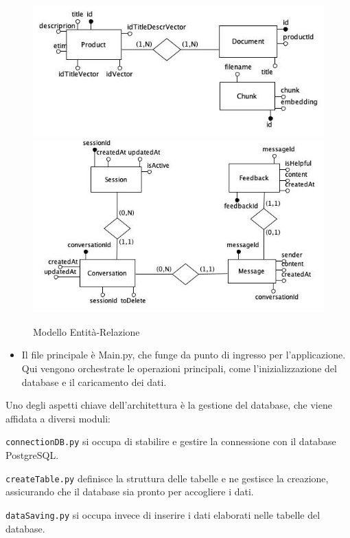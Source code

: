 \begin{figure}[H]
    \centering
    \includegraphics[width=\textwidth]{images/productER.er.jpg}
    \includegraphics[width=\textwidth]{images/MessagesER.er.jpg}
    \caption{Modello Entit\`a-Relazione}
    \label{fig:Diagramma ER}
\end{figure}

\begin{itemize}
\item Il file principale è \texttt{}{Main.py}, che funge da punto di ingresso per l'applicazione. Qui vengono orchestrate le operazioni principali, come l'inizializzazione del database e il caricamento dei dati.
\end{itemize}
Uno degli aspetti chiave dell'architettura è la gestione del database, che viene affidata a diversi moduli:

\texttt{connectionDB.py} si occupa di stabilire e gestire la connessione con il database PostgreSQL.

\texttt{createTable.py} definisce la struttura delle tabelle e ne gestisce la creazione, assicurando che il database sia pronto per accogliere i dati.

\texttt{dataSaving.py} si occupa invece di inserire i dati elaborati nelle tabelle del database.

